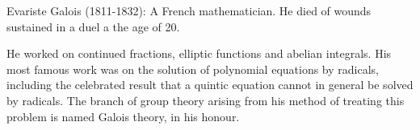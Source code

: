 Evariste Galois (1811-1832): A French mathematician. He died of wounds 
sustained in a duel a the age of 20.
\par
He worked on continued fractions, elliptic functions and abelian integrals.
His most famous work was on the solution of polynomial equations by radicals,
including the celebrated result that a quintic equation cannot in general
be solved by radicals. The branch of group theory arising from his method of 
treating this problem is named Galois theory, in his honour.